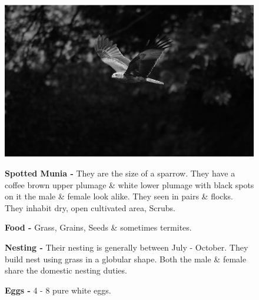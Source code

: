\begin{figure}[H]
\begin{center}
\includegraphics{figure/Land_birds/01_pariah_kite/pariah-kite.eps}
\end{center}
\medskip
\noindent
{\bf Spotted Munia -} They are the size of a sparrow. They have a coffee brown upper plumage \& white lower plumage with black spots on it the male \& female look alike. They seen in pairs \& flocks. They inhabit dry, open cultivated area, Scrubs. 

\medskip
{\bf Food -} Grass, Grains, Seeds \& sometimes termites.

{\bf Nesting -} Their nesting is generally between July - October. They build nest using grass in a globular shape. Both the male \& female share the domestic nesting duties.

{\bf Eggs -} 4 - 8 pure white eggs.
\end{figure}

\vfill\eject

~\phantom{a}
\vfill

